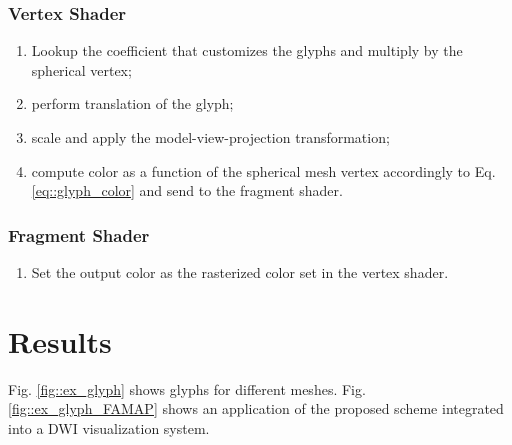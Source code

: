 \documentclass[twoside,twocolumn,10pt]{article}
\begin{document}
\subsubsection{Vertex Shader}
\begin{enumerate}
    \item Lookup the coefficient that customizes the glyphs and multiply by the spherical vertex;
    \item perform translation of the glyph;
    \item scale and apply the model-view-projection transformation;
    \item compute color as a function of the spherical mesh vertex accordingly to Eq. \ref{eq::glyph_color} and send to the fragment shader.
\end{enumerate}
\subsubsection{Fragment Shader}
\begin{enumerate}
    \item Set the output color as the rasterized color set in the vertex shader.
\end{enumerate}





\section{Results}
\label{sec::results}
Fig. \ref{fig::ex_glyph} shows glyphs for different meshes. Fig. \ref{fig::ex_glyph_FAMAP} shows an application of the proposed scheme integrated into a DWI visualization system.
\end{document}
